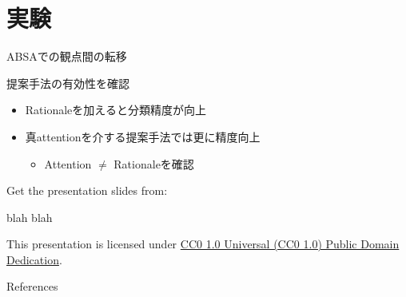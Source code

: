 \section{実験}
\frame[standout]{\insertsection}


\begin{frame}{ABSAでの観点間の転移}
\begin{lead}
    提案手法の有効性を確認
\end{lead}
\begin{itemize}
\item Rationaleを加えると分類精度が向上
\item 真attentionを介する提案手法では更に精度向上
\begin{itemize}
    \item Attention $\neq$ Rationaleを確認
\end{itemize}
\end{itemize}
\end{frame}





\begin{frame}[c]

  Get the presentation slides from:

  \begin{center}blah blah\end{center}

  This presentation is licensed under
    \href{https://creativecommons.org/publicdomain/zero/1.0/}{
    CC0 1.0 Universal (CC0 1.0) Public Domain Dedication}.

  \begin{center}\cczero\end{center}

\end{frame}

\begin{frame}[allowframebreaks]{References}
  \printbibliography[heading=none]
\end{frame}



